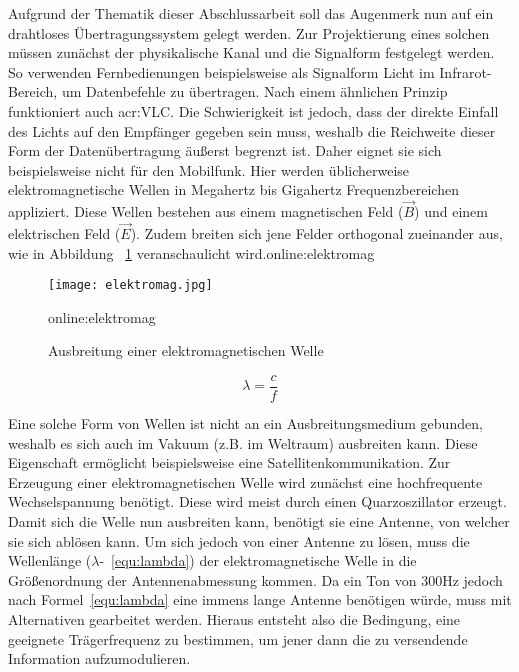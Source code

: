 Aufgrund der Thematik dieser Abschlussarbeit soll das Augenmerk nun auf ein drahtloses Übertragungssystem gelegt werden. Zur Projektierung eines solchen müssen zunächst der physikalische Kanal und die Signalform festgelegt werden.
So verwenden Fernbedienungen beispielsweise als Signalform Licht im Infrarot-Bereich, um Datenbefehle zu übertragen. Nach einem ähnlichen Prinzip funktioniert auch \gls{acr:VLC}. Die Schwierigkeit ist jedoch, dass der direkte Einfall des Lichts auf den Empfänger gegeben sein muss, weshalb die Reichweite dieser Form der Datenübertragung äußerst begrenzt ist. Daher eignet sie sich beispielsweise nicht für den Mobilfunk. Hier werden üblicherweise elektromagnetische Wellen in Megahertz bis Gigahertz Frequenzbereichen appliziert. Diese Wellen bestehen aus einem magnetischen Feld ($\vec{B}$) und einem elektrischen Feld ($\vec{E}$). Zudem breiten sich jene Felder orthogonal zueinander aus, wie in Abbildung ~\ref{fig:elektromag} veranschaulicht wird.\gls{online:elektromag} 

\begin{figure}[H]
	\centering
	\texttt{[image: elektromag.jpg]}
	\caption[Ausbreitung einer elektromagnetischen Welle]{Ausbreitung einer elektromagnetischen Welle} 
	\gls{online:elektromag}
	\label{fig:elektromag}
\end{figure}
\begin{equation}
	\label{equ:lambda}
	\lambda = \frac{c}{f} 
\end{equation}

Eine solche Form von Wellen ist nicht an ein Ausbreitungsmedium gebunden, weshalb es sich auch im Vakuum (z.B. im Weltraum) ausbreiten kann. Diese Eigenschaft ermöglicht beispielsweise eine Satellitenkommunikation. Zur Erzeugung einer elektromagnetischen Welle wird zunächst eine hochfrequente Wechselspannung benötigt. Diese wird meist durch einen Quarzoszillator erzeugt. Damit sich die Welle nun ausbreiten kann, benötigt sie eine Antenne, von welcher sie sich ablösen kann.\cite{howwireless}\cite{wernerNachrichtentechnikEinfuehrungFuer2010} Um sich jedoch von einer Antenne zu lösen, muss die Wellenlänge ($\lambda$-~\ref{equ:lambda}) der elektromagnetische Welle in die Größenordnung der Antennenabmessung kommen. Da ein Ton von 300Hz jedoch nach Formel~\ref{equ:lambda} eine immens lange Antenne benötigen würde, muss mit Alternativen gearbeitet werden. Hieraus entsteht also die Bedingung, eine geeignete Trägerfrequenz zu bestimmen, um jener dann die zu versendende Information aufzumodulieren.\cite{heuermannHochfrequenztechnikKomponentenFuer2018}\cite{hoeher}


